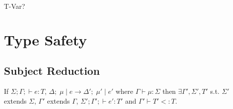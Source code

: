 \documentclass{llncs}
\begin{document}




T-Var? 

\section{Type Safety}

\subsection{Subject Reduction}


\begin{theorem}
If $\Sigma; \Gamma;  \vdash e : T$, 
   	$\Delta; \; \mu \; | \; e \rightarrow \Delta'; \; \mu' \; | \; e'$ where
	$\Gamma \vdash \mu : \Sigma$ then 
 	$\exists \Gamma', \Sigma', T'$ s.t. 
	$\Sigma'$ extends $\Sigma$,
	$\Gamma'$ extends $\Gamma$,
	$\Sigma'; \Gamma';  \vdash e' : T'$
	and $\Gamma' \vdash T'<:T$.
\end{theorem}
\end{document}
